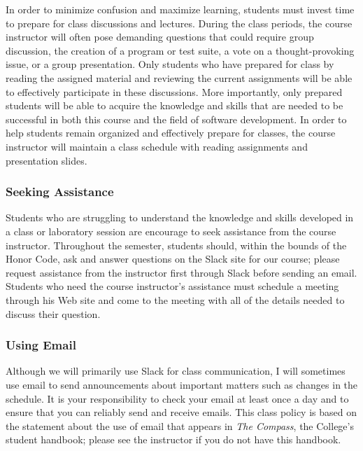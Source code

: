 \documentclass[11pt]{article}
\begin{document}
In order to minimize confusion and maximize learning, students must invest time to prepare for class discussions and
lectures. During the class periods, the course instructor will often pose demanding questions that could require group
discussion, the creation of a program or test suite, a vote on a thought-provoking issue, or a group presentation.
Only students who have prepared for class by reading the assigned material and reviewing the current assignments will be
able to effectively participate in these discussions. More importantly, only prepared students will be able to acquire
the knowledge and skills that are needed to be successful in both this course and the field of software development. In
order to help students remain organized and effectively prepare for classes, the course instructor will maintain a class
schedule with reading assignments and presentation slides.


\subsubsection*{Seeking Assistance}

Students who are struggling to understand the knowledge and skills developed in a class or laboratory session are
encourage to seek assistance from the course instructor. Throughout the semester, students should, within the bounds of
the Honor Code, ask and answer questions on the Slack site for our course; please request assistance from the instructor
first through Slack before sending an email. Students who need the course instructor's assistance must schedule a
meeting through his Web site and come to the meeting with all of the details needed to discuss their question.

\subsubsection*{Using Email}

Although we will primarily use Slack for class communication, I will sometimes use email to send announcements about
important matters such as changes in the schedule. It is your responsibility to check your email at least once a day and to
ensure that you can reliably send and receive emails. This class policy is based on the statement about the use of email that
appears in {\em The Compass}, the College's student handbook; please see the instructor if you do not have this
handbook.
\end{document}
